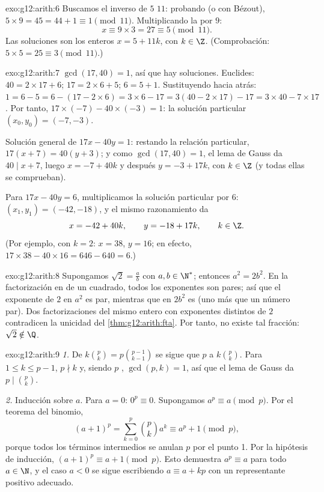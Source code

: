 \begin{solution}{exo:g12:arith:6}
Buscamos el inverso de $5$  $11$: probando (o con Bézout),
$5 \times 9 = 45 = 44 + 1 \equiv 1 \pmod{11}$. Multiplicando la 
por $9$:
\[
x \equiv 9 \times 3 = 27 \equiv 5 \pmod{11}.
\]
Las soluciones son los enteros $x = 5 + 11k$, con $k \in \Z$.
(Comprobación: $5\times5 = 25 \equiv 3 \pmod{11}$.)
\end{solution}

\begin{solution}{exo:g12:arith:7}
$\gcd(17, 40) = 1$, así que hay soluciones. Euclides:
$40 = 2\times17 + 6$; $17 = 2\times6 + 5$; $6 = 5 + 1$. Sustituyendo hacia
atrás: $1 = 6 - 5 = 6 - (17 - 2\times6) = 3\times6 - 17
= 3(40 - 2\times17) - 17 = 3\times40 - 7\times17$. Por tanto,
$17\times(-7) - 40\times(-3) = 1$: la solución particular
$(x_0, y_0) = (-7, -3)$.

Solución general de $17x - 40y = 1$: restando la relación particular,
$17(x + 7) = 40(y + 3)$; y como $\gcd(17, 40) = 1$, el lema de Gauss da
$40 \mid x + 7$, luego $x = -7 + 40k$ y después $y = -3 + 17k$, con
$k \in \Z$ (y todas ellas se comprueban).

Para $17x - 40y = 6$, multiplicamos la solución particular por $6$:
$(x_1, y_1) = (-42, -18)$, y el mismo razonamiento da
\[
x = -42 + 40k, \qquad y = -18 + 17k, \qquad k \in \Z .
\]
(Por ejemplo, con $k = 2$: $x = 38$, $y = 16$; en efecto,
$17\times38 - 40\times16 = 646 - 640 = 6$.)
\end{solution}

\begin{solution}{exo:g12:arith:8}
Supongamos $\sqrt2 = \frac ab$ con $a, b \in \N^*$; entonces
$a^2 = 2b^2$. En la factorización en  de un cuadrado, todos los
exponentes son pares; así que el exponente de $2$ en $a^2$ es par, mientras
que en $2b^2$ es  (uno más que un número par). Dos factorizaciones del
mismo entero con exponentes distintos de $2$ contradicen la unicidad del
\cref{thm:g12:arith:fta}. Por tanto, no existe tal fracción:
$\sqrt2 \notin \Q$.
\end{solution}

\begin{solution}{exo:g12:arith:9}
\emph{1.} De $k\binom pk = p \binom{p-1}{k-1}$ se sigue que $p$  a
$k\binom pk$. Para $1 \leq k \leq p-1$, $p \nmid k$ y, siendo $p$ ,
$\gcd(p, k) = 1$, así que el lema de Gauss da $p \mid \binom pk$.

\emph{2.} Inducción sobre $a$. Para $a = 0$: $0^p \equiv 0$. Supongamos
$a^p \equiv a \pmod p$. Por el teorema del binomio,
\[
(a+1)^p = \sum_{k=0}^{p} \binom pk a^k
\equiv a^p + 1 \pmod p,
\]
porque todos los términos intermedios se anulan  $p$ por el punto 1.
Por la hipótesis de inducción, $(a+1)^p \equiv a + 1 \pmod p$. Esto
demuestra $a^p \equiv a$ para todo $a \in \N$, y el caso $a < 0$ se sigue
escribiendo $a \equiv a + kp$ con un representante positivo adecuado.
\end{solution}

